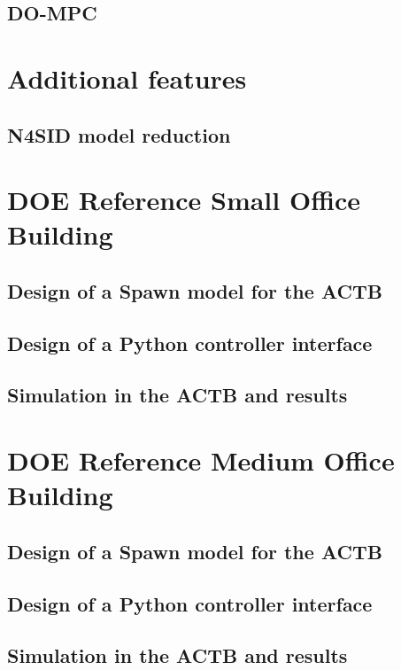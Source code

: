 \documentclass{article}
\begin{document}
\subsection{DO-MPC}

\section{Additional features}

\subsection{N4SID model reduction}

\appendix
\appendixpage
\addappheadtotoc

\section{DOE Reference Small Office Building}

\subsection{Design of a Spawn model for the ACTB}

\subsection{Design of a Python controller interface}

\subsection{Simulation in the ACTB and results}

\section{DOE Reference Medium Office Building}

\subsection{Design of a Spawn model for the ACTB}

\subsection{Design of a Python controller interface}

\subsection{Simulation in the ACTB and results}



\end{document}
